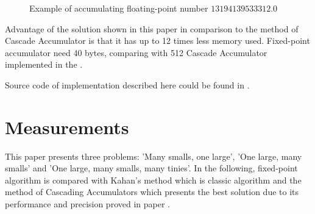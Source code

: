 \documentclass[conference]{IEEEtran}
\begin{document}
\begin{figure}[!t]
	
	\caption{Example of accumulating floating-point number $13194139533312.0$}
	\label{fig:fix_acc_example}
\end{figure}

\par
Advantage of the solution shown in this paper in comparison to the method of Cascade Accumulator 
is that it has up to 12 times less memory used.
Fixed-point accumulator need 40 bytes, 
comparing with 512 Cascade Accumulator implemented in the \cite{ComparisonOfMethods}.
\par
Source code of implementation described here could be found in \cite{FixAccGitHub}.


\section{Measurements}
This paper presents three problems: 'Many smalls, one large',
'One large, many smalls' and 'One large, many smalls, many tinies'.
In the following, fixed-point algorithm is compared with Kahan's method
which is classic algorithm and the method of Cascading Accumulators 
which presents the best solution due to its performance and precision 
proved in paper \cite{CascadingAccumulators}.
\end{document}
